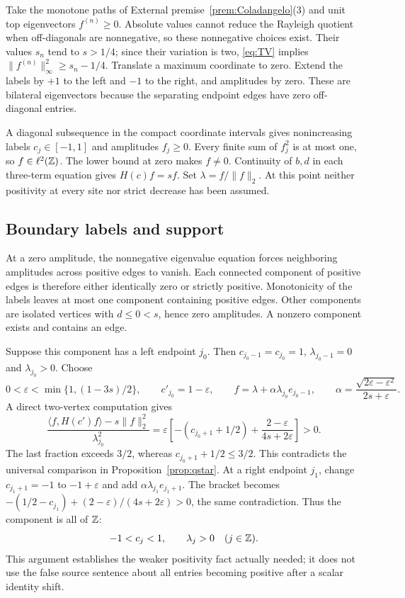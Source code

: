 Take the monotone paths of External premise~\ref{prem:Coladangelo}(3)
and unit top eigenvectors \(f^{(n)}\ge0\). Absolute values cannot reduce
the Rayleigh quotient when off-diagonals are nonnegative, so these
nonnegative choices exist. Their values \(s_n\) tend to \(s>1/4\);
since their variation is two, \eqref{eq:TV} implies
\(\|f^{(n)}\|_\infty^2\ge s_n-1/4\).
Translate a maximum coordinate to zero. Extend the labels by \(+1\)
to the left and \(-1\) to the right, and amplitudes by zero. These are
bilateral eigenvectors because the separating endpoint edges have
zero off-diagonal entries.

A diagonal subsequence in the compact coordinate intervals gives
nonincreasing labels \(c_j\in[-1,1]\) and amplitudes \(f_j\ge0\).
Every finite sum of \(f_j^2\) is at most one, so \(f\in\ell^2(\mathbb Z)\).
The lower bound at zero makes \(f\ne0\). Continuity of \(b,d\) in each
three-term equation gives \(H(c)f=sf\). Set \(\lambda=f/\|f\|_2\).
At this point neither positivity at every site nor strict decrease
has been assumed.

\subsection{Boundary labels and support}
At a zero amplitude, the nonnegative eigenvalue equation forces
neighboring amplitudes across positive edges to vanish. Each connected
component of positive edges is therefore either identically zero or
strictly positive. Monotonicity of the labels leaves at most one
component containing positive edges. Other components are isolated
vertices with \(d\le0<s\), hence zero amplitudes. A nonzero component
exists and contains an edge.

Suppose this component has a left endpoint \(j_0\). Then
\(c_{j_0-1}=c_{j_0}=1\), \(\lambda_{j_0-1}=0\) and
\(\lambda_{j_0}>0\). Choose
\[
 0<\varepsilon<\min\{1,(1-3s)/2\},\qquad
 c'_{j_0}=1-\varepsilon,\qquad
 f=\lambda+\alpha\lambda_{j_0}e_{j_0-1},\qquad
 \alpha=\frac{\sqrt{2\varepsilon-\varepsilon^2}}{2s+\varepsilon}.
\]
A direct two-vertex computation gives
\[
 \frac{\langle f,H(c')f\rangle-s\|f\|_2^2}{\lambda_{j_0}^2}
 =\varepsilon\left[-(c_{j_0+1}+1/2)
                +\frac{2-\varepsilon}{4s+2\varepsilon}\right]>0.
\]
The last fraction exceeds \(3/2\), whereas \(c_{j_0+1}+1/2\le3/2\).
This contradicts the universal comparison in
Proposition~\ref{prop:qstar}. At a right endpoint \(j_1\), change
\(c_{j_1+1}=-1\) to \(-1+\varepsilon\) and add
\(\alpha\lambda_{j_1}e_{j_1+1}\). The bracket becomes
\(-(1/2-c_{j_1})+(2-\varepsilon)/(4s+2\varepsilon)>0\),
the same contradiction. Thus the component is all of \(\mathbb Z\):
\begin{equation}\label{eq:interiorpositive}
 -1<c_j<1,\qquad \lambda_j>0\quad(j\in\mathbb Z).
\end{equation}
This argument establishes the weaker positivity fact actually needed;
it does not use the false source sentence about all entries becoming
positive after a scalar identity shift.

